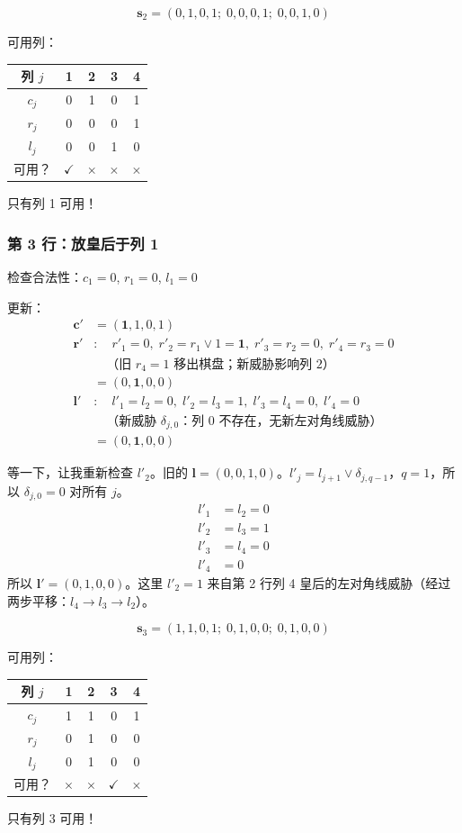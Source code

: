 \documentclass[12pt,a4paper]{ctexart}
\begin{document}
\[
\mathbf{s}_2 = (0,1,0,1;\; 0,0,0,1;\; 0,0,1,0)
\]

可用列：
\begin{center}
\begin{tabular}{c|cccc}
列 $j$ & 1 & 2 & 3 & 4 \\ \hline
$c_j$ & 0 & 1 & 0 & 1 \\
$r_j$ & 0 & 0 & 0 & 1 \\
$l_j$ & 0 & 0 & 1 & 0 \\
可用？ & $\checkmark$ & $\times$ & $\times$ & $\times$
\end{tabular}
\end{center}
只有列 1 可用！

\subsubsection*{第 3 行：放皇后于列 1}

检查合法性：$c_1 = 0$, $r_1 = 0$, $l_1 = 0$ \checkmark

更新：
\begin{align*}
\mathbf{c}' &= (\mathbf{1}, 1, 0, 1) \\
\mathbf{r}' &: \quad r'_1 = 0,\; r'_2 = r_1 \lor 1 = \mathbf{1},\; r'_3 = r_2 = 0,\; r'_4 = r_3 = 0 \\
&\quad\text{（旧 $r_4 = 1$ 移出棋盘；新威胁影响列 2）} \\
&= (0, \mathbf{1}, 0, 0) \\
\mathbf{l}' &: \quad l'_1 = l_2 = 0,\; l'_2 = l_3 = 1,\; l'_3 = l_4 = 0,\; l'_4 = 0 \\
&\quad\text{（新威胁 $\delta_{j,0}$：列 0 不存在，无新左对角线威胁）} \\
&= (0, \mathbf{1}, 0, 0)
\end{align*}

等一下，让我重新检查 $l'_2$。旧的 $\mathbf{l} = (0, 0, 1, 0)$。$l'_j = l_{j+1} \lor \delta_{j, q-1}$，$q = 1$，所以 $\delta_{j, 0} = 0$ 对所有 $j$。
\begin{align*}
l'_1 &= l_2 = 0 \\
l'_2 &= l_3 = 1 \\
l'_3 &= l_4 = 0 \\
l'_4 &= 0
\end{align*}
所以 $\mathbf{l}' = (0, 1, 0, 0)$。这里 $l'_2 = 1$ 来自第 2 行列 4 皇后的左对角线威胁（经过两步平移：$l_4 \to l_3 \to l_2$）。

\[
\mathbf{s}_3 = (1,1,0,1;\; 0,1,0,0;\; 0,1,0,0)
\]

可用列：
\begin{center}
\begin{tabular}{c|cccc}
列 $j$ & 1 & 2 & 3 & 4 \\ \hline
$c_j$ & 1 & 1 & 0 & 1 \\
$r_j$ & 0 & 1 & 0 & 0 \\
$l_j$ & 0 & 1 & 0 & 0 \\
可用？ & $\times$ & $\times$ & $\checkmark$ & $\times$
\end{tabular}
\end{center}
只有列 3 可用！
\end{document}
